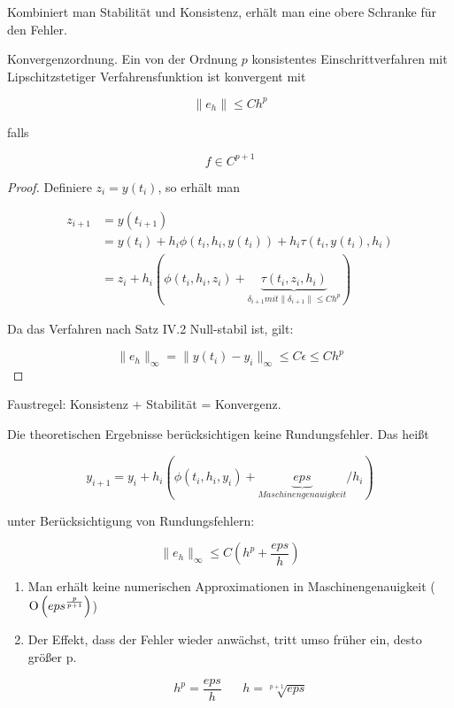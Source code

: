 Kombiniert man Stabilität und Konsistenz, erhält man eine obere Schranke für den Fehler.

\begin{theorem}
	Konvergenzordnung. Ein von der Ordnung $p$ konsistentes Einschrittverfahren mit Lipschitzstetiger Verfahrensfunktion ist konvergent mit
	
	$$\|e_h\| \le Ch^p$$
	
	falls
	
	$$f \in C^{p+1}$$
\end{theorem}

\begin{proof}
	Definiere $z_i = y(t_i)$, so erhält man 
	
	\begin{align*}
		z_{i+1} &= y(t_{i+1}) \\
		&= y(t_i) + h_i \phi(t_i, h_i, y(t_i)) + h_i \tau(t_i, y(t_i), h_i)\\
		&= z_i + h_i(\phi(t_i, h_i, z_i) + \underbrace{\tau(t_i, z_i, h_i)}_{\delta_{i+1} mit \|\delta_{i+1}\| \le Ch^p})
	\end{align*}
	
	Da das Verfahren nach Satz IV.2 Null-stabil ist, gilt:
	
	$$\|e_h\|_\infty = \|y(t_i) - y_i\|_\infty \le C\epsilon \le Ch^p$$
\end{proof}

Faustregel: Konsistenz + Stabilität = Konvergenz.

\begin{remark}
	Die theoretischen Ergebnisse berücksichtigen keine Rundungsfehler. Das heißt
	
	$$y_{i+1} = y_{i} + h_i \left(\phi\left(t_i, h_i, y_i\right) + \underbrace{eps}_{Maschinengenauigkeit} / h_i \right)$$
	
	unter Berücksichtigung von Rundungsfehlern:
	
	$$\|e_h\|_\infty \le C\left(h^p + \frac{eps}{h}\right)$$
	
	\begin{enumerate}
		\item Man erhält keine numerischen Approximationen in Maschinengenauigkeit ($\operatorname{O}\left(eps^{\frac{p}{p+1}}\right)$)
		\item Der Effekt, dass der Fehler wieder anwächst, tritt umso früher ein, desto größer p.
		
		$$h^p = \frac{eps}{h}\;\;\;\;\;\;h = \sqrt[p+1]{eps}$$
	\end{enumerate}
\end{remark}

